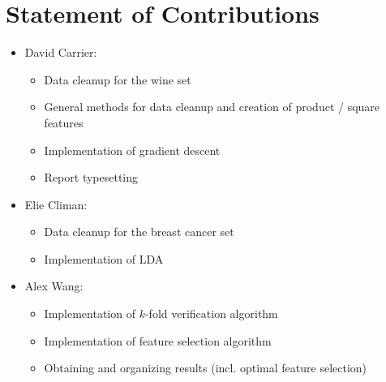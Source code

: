 \documentclass[11pt,letterpaper]{article}
\begin{document}
    \newpage
    \section*{Statement of Contributions}
    
    \begin{itemize}
        \item David Carrier:
        \begin{itemize}
            \item Data cleanup for the wine set
            \item General methods for data cleanup and creation of product / square features
            \item Implementation of gradient descent
            \item Report typesetting
        \end{itemize}
        
        \item Elie Climan:
        \begin{itemize}
            \item Data cleanup for the breast cancer set
            \item Implementation of LDA
            
        \end{itemize}
        
        \item Alex Wang:
        \begin{itemize}
            \item Implementation of $k$-fold verification algorithm
            \item Implementation of feature selection algorithm
            \item Obtaining and organizing results (incl. optimal feature selection)
        \end{itemize}
    \end{itemize}
    
\end{document}
